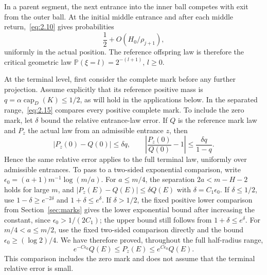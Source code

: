 \documentclass[11pt,a4paper]{article}
\numberwithin{equation}{section}
\theoremstyle{remark}
\begin{document}
In a parent segment, the next entrance into the inner ball competes with exit from the outer ball. At the initial middle entrance and after each middle return,~\eqref{eq:2.10} gives probabilities
\begin{equation}\label{eq:2.23}
\frac12+O(H_0/\rho_{j+1}),
\end{equation}
uniformly in the actual position. The reference offspring law is therefore the critical geometric law $\mathbb P(\xi=l)=2^{-(l+1)}$, $l\ge0$.

At the terminal level, first consider the complete mark before any further projection. Assume explicitly that its reference positive mass is $q=\alpha\operatorname{cap}_D(K)\le1/2$, as will hold in the applications below. In the separated range,~\eqref{eq:2.15} compares every positive complete mark. To include the zero mark, let $\delta$ bound the relative entrance-law error. If $Q$ is the reference mark law and $P_z$ the actual law from an admissible entrance $z$, then
\[
|P_z(0)-Q(0)|\le\delta q,\qquad
\left|\frac{P_z(0)}{Q(0)}-1\right|
\le\frac{\delta q}{1-q}.
\]
Hence the same relative error applies to the full terminal law, uniformly over admissible entrances. To pass to a two-sided exponential comparison, write $\epsilon_0=(a+1)m^{-1}\log(m/a)$. For $a\le m/4$, the separation $2a<m-H-2$ holds for large $m$, and $|P_z(E)-Q(E)|\le\delta Q(E)$ with $\delta=C_1\epsilon_0$. If $\delta\le1/2$, use $1-\delta\ge e^{-2\delta}$ and $1+\delta\le e^\delta$. If $\delta>1/2$, the fixed positive lower comparison from Section~\ref{sec:marks} gives the lower exponential bound after increasing the constant, since $\epsilon_0>1/(2C_1)$; the upper bound still follows from $1+\delta\le e^\delta$. For $m/4<a\le m/2$, use the fixed two-sided comparison directly and the bound $\epsilon_0\ge(\log2)/4$. We have therefore proved, throughout the full half-radius range,
\[
e^{-C\epsilon_0}Q(E)\le P_z(E)\le e^{C\epsilon_0}Q(E).
\]
This comparison includes the zero mark and does not assume that the terminal relative error is small.
\end{document}
